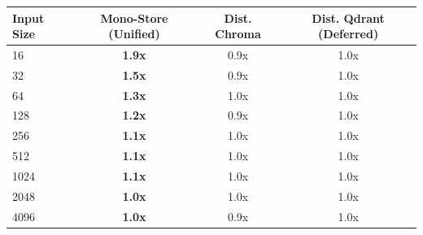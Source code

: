\begin{tabular}{lccc}
\toprule
\textbf{Input Size} & \textbf{Mono-Store (Unified)} & \textbf{Dist. Chroma} & \textbf{Dist. Qdrant (Deferred)} \\
\midrule
16 & \textbf{1.9x} & 0.9x & 1.0x \\
32 & \textbf{1.5x} & 0.9x & 1.0x \\
64 & \textbf{1.3x} & 1.0x & 1.0x \\
128 & \textbf{1.2x} & 0.9x & 1.0x \\
256 & \textbf{1.1x} & 1.0x & 1.0x \\
512 & \textbf{1.1x} & 1.0x & 1.0x \\
1024 & \textbf{1.1x} & 1.0x & 1.0x \\
2048 & \textbf{1.0x} & 1.0x & 1.0x \\
4096 & \textbf{1.0x} & 0.9x & 1.0x \\
\bottomrule
\end{tabular}
